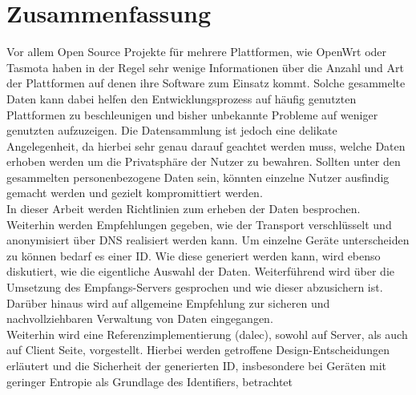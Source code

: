 \chapter*{Zusammenfassung}
\label{chap:abstract_de}

Vor allem Open Source Projekte für mehrere Plattformen, wie OpenWrt oder Tasmota haben in der Regel sehr wenige Informationen über die Anzahl und Art der Plattformen auf denen ihre Software zum Einsatz kommt. Solche gesammelte Daten kann dabei helfen den Entwicklungsprozess auf häufig genutzten Plattformen zu beschleunigen und bisher unbekannte Probleme auf weniger genutzten aufzuzeigen. Die Datensammlung ist jedoch eine delikate Angelegenheit, da hierbei sehr genau darauf geachtet werden muss, welche Daten erhoben werden um die Privatsphäre der Nutzer zu bewahren. Sollten unter den gesammelten personenbezogene Daten sein, könnten einzelne Nutzer ausfindig gemacht werden und gezielt kompromittiert werden.\\

In dieser Arbeit werden Richtlinien zum erheben der Daten besprochen. Weiterhin werden Empfehlungen gegeben, wie der Transport verschlüsselt und anonymisiert über DNS realisiert werden kann. Um einzelne Geräte unterscheiden zu können bedarf es einer ID. Wie diese generiert werden kann, wird ebenso diskutiert, wie die eigentliche Auswahl der Daten. Weiterführend wird über die Umsetzung des Empfangs-Servers gesprochen und wie dieser abzusichern ist. Darüber hinaus wird auf allgemeine Empfehlung zur sicheren und nachvollziehbaren Verwaltung von Daten eingegangen.\\

Weiterhin wird eine Referenzimplementierung (dalec), sowohl auf Server, als auch auf Client Seite, vorgestellt. Hierbei werden getroffene Design-Entscheidungen erläutert und die Sicherheit der generierten ID, insbesondere bei Geräten mit geringer Entropie als Grundlage des Identifiers, betrachtet

%

